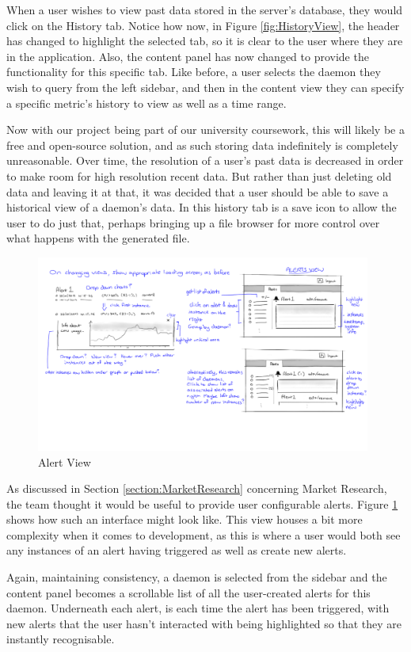 \documentclass{l3proj}
\begin{document}
When a user wishes to view past data stored in the server's database, they would click on the History tab. Notice how now, in Figure \ref{fig:HistoryView}, the header has changed to highlight the selected tab, so it is clear to the user where they are in the application. Also, the content panel has now changed to provide the functionality for this specific tab. Like before, a user selects the daemon they wish to query from the left sidebar, and then in the content view they can specify a specific metric's history to view as well as a time range.

Now with our project being part of our university coursework, this will likely be a free and open-source solution, and as such storing data indefinitely is completely unreasonable. Over time, the resolution of a user's past data is decreased in order to make room for high resolution recent data. But rather than just deleting old data and leaving it at that, it was decided that a user should be able to save a historical view of a daemon's data. In this history tab is a save icon to allow the user to do just that, perhaps bringing up a file browser for more control over what happens with the generated file.

\begin{figure}[H]
\centering
\includegraphics[width=110mm]{Concept_Designs/AlertView.png}
\caption{Alert View}
\label{fig:AlertView}
\end{figure}

As discussed in Section \ref{section:MarketResearch} concerning Market Research, the team thought it would be useful to provide user configurable alerts. Figure \ref{fig:AlertView} shows how such an interface might look like. This view houses a bit more complexity when it comes to development, as this is where a user would both see any instances of an alert having triggered as well as create new alerts.

Again, maintaining consistency, a daemon is selected from the sidebar and the content panel becomes a scrollable list of all the user-created alerts for this daemon. Underneath each alert, is each time the alert has been triggered, with new alerts that the user hasn't interacted with being highlighted so that they are instantly recognisable.
\end{document}
